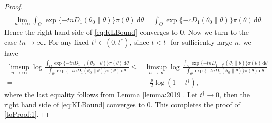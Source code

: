 \documentclass[11pt]{article}
\theoremstyle{plain}
\theoremstyle{definition}
\theoremstyle{remark}
\begin{document}
\begin{appendices}
\begin{proof}
\begin{align*}
    \\
    &
    \lim_{n\to \infty} \int_{\Theta} \exp \{-tn D_{1}(\theta_0 \| \theta)\} \pi (\theta) \, \mathrm d \theta
    =
    \int_{\Theta} \exp \{-c D_{1}(\theta_0 \| \theta)\} \pi (\theta) \, \mathrm d \theta
    .
\end{align*}
Hence the right hand side of \eqref{eq:KLBound} converges to $0$.
Now we turn to the case $tn \to \infty$. 
For any fixed $t^\dagger \in (0,t^*)$,
since $t < t^\dagger$ for sufficiently large $n$, we have
\begin{align*}
    \limsup_{n \to \infty}
    \log
        \frac{
            \int_{\Theta} \exp \{-tn D_{1-t}(\theta_0 \| \theta)\} \pi (\theta) \, \mathrm d \theta
        }{
            \int_{\Theta} \exp \{-tn D_{1}(\theta_0 \| \theta)\} \pi (\theta) \, \mathrm d \theta
        }
        \leq&
    \limsup_{n \to \infty}
\log
        \frac{
            \int_{\Theta} \exp \{-tn D_{1-t^\dagger}(\theta_0 \| \theta)\} \pi (\theta) \, \mathrm d \theta
        }{
            \int_{\Theta} \exp \{-tn D_{1}(\theta_0 \| \theta)\} \pi (\theta) \, \mathrm d \theta
        }
        \\
 = &
 -\frac{p}{2}\log(1-t^\dagger)
 ,
\end{align*}
where the last equality follows from Lemma \ref{lemma:2019}.
Let $t^\dagger \to 0$, then the right hand side of \eqref{eq:KLBound} converges to $0$.
This completes the proof of \eqref{toProof:1}.



\end{proof}
\end{appendices}
\end{document}
